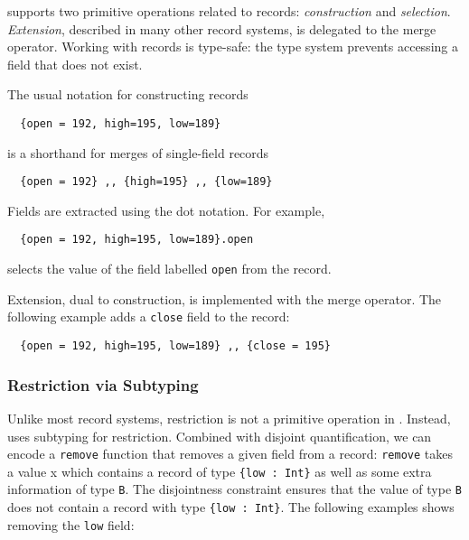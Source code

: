 \name supports two primitive operations related to records:
\textit{construction} and \textit{selection}. \textit{Extension}, described in
many other record systems, is delegated to the merge operator. Working with
records is type-safe: the type system prevents accessing a field that does not
exist.

The usual notation for constructing records
\begin{lstlisting}
  {open = 192, high=195, low=189}
\end{lstlisting}
is a shorthand for merges of single-field records
\begin{lstlisting}
  {open = 192} ,, {high=195} ,, {low=189}
\end{lstlisting}

Fields are extracted using the dot notation. For example,
\begin{lstlisting}
  {open = 192, high=195, low=189}.open
\end{lstlisting}
selects the value of the field labelled \lstinline{open} from the record.

Extension, dual to construction, is implemented with the merge operator. The
following example adds a \lstinline{close} field to the record:
\begin{lstlisting}
  {open = 192, high=195, low=189} ,, {close = 195}
\end{lstlisting}


\subsubsection{Restriction via Subtyping}

Unlike most record systems, restriction is not a primitive operation in \name.
Instead, \name uses subtyping for restriction. Combined with disjoint
quantification, we can encode a \lstinline{remove} function that removes a given
field from a record:
\lstinline{remove} takes a value x which contains a record of type
\lstinline${low : Int}$ as well as some extra information of type \lstinline{B}.
The disjointness constraint ensures that the value of type \lstinline{B} does
not contain a record with type \lstinline${low : Int}$. The following examples
shows removing the \lstinline{low} field:
